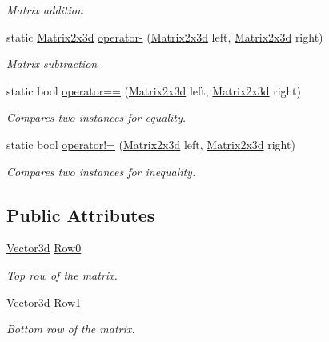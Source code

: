 \begin{DoxyCompactItemize}
\begin{DoxyCompactList}\small\item\em Matrix addition \end{DoxyCompactList}\item 
static \hyperlink{struct_open_t_k_1_1_matrix2x3d}{Matrix2x3d} \hyperlink{struct_open_t_k_1_1_matrix2x3d_ab37adb7a8d2e157e139f6f4bbece5295}{operator-\/} (\hyperlink{struct_open_t_k_1_1_matrix2x3d}{Matrix2x3d} left, \hyperlink{struct_open_t_k_1_1_matrix2x3d}{Matrix2x3d} right)
\begin{DoxyCompactList}\small\item\em Matrix subtraction \end{DoxyCompactList}\item 
static bool \hyperlink{struct_open_t_k_1_1_matrix2x3d_a2919da799ce955c0ade239c008e21b03}{operator==} (\hyperlink{struct_open_t_k_1_1_matrix2x3d}{Matrix2x3d} left, \hyperlink{struct_open_t_k_1_1_matrix2x3d}{Matrix2x3d} right)
\begin{DoxyCompactList}\small\item\em Compares two instances for equality. \end{DoxyCompactList}\item 
static bool \hyperlink{struct_open_t_k_1_1_matrix2x3d_aed9f52e681cd1bf76fbd04630a658fd8}{operator!=} (\hyperlink{struct_open_t_k_1_1_matrix2x3d}{Matrix2x3d} left, \hyperlink{struct_open_t_k_1_1_matrix2x3d}{Matrix2x3d} right)
\begin{DoxyCompactList}\small\item\em Compares two instances for inequality. \end{DoxyCompactList}\end{DoxyCompactItemize}
\subsection*{Public Attributes}
\begin{DoxyCompactItemize}
\item 
\hyperlink{struct_open_t_k_1_1_vector3d}{Vector3d} \hyperlink{struct_open_t_k_1_1_matrix2x3d_a522e12a13912760ad59d655f26d4b014}{Row0}
\begin{DoxyCompactList}\small\item\em Top row of the matrix. \end{DoxyCompactList}\item 
\hyperlink{struct_open_t_k_1_1_vector3d}{Vector3d} \hyperlink{struct_open_t_k_1_1_matrix2x3d_a75f52d299462e84b8546f55cddfde9c9}{Row1}
\begin{DoxyCompactList}\small\item\em Bottom row of the matrix. \end{DoxyCompactList}\end{DoxyCompactItemize}
